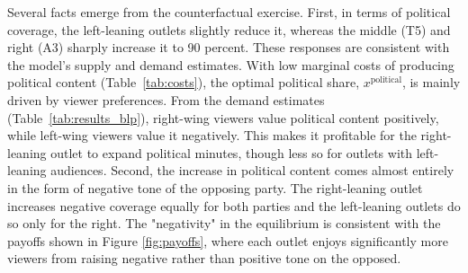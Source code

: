 \documentclass[12pt]{article}
\begin{document}
	
	
	
	
	
	Several facts emerge from the counterfactual exercise. First, in terms of political coverage, the left-leaning outlets slightly reduce it, whereas the middle (T5) and right (A3) sharply increase it to 90 percent. These responses are consistent with the model’s supply and demand estimates. With low marginal costs of producing political content (Table~\ref{tab:costs}), the optimal political share, $x^{\text{political}}$, is mainly driven by viewer preferences. From the demand estimates (Table~\ref{tab:results_blp}), right-wing viewers value political content positively, while left-wing viewers value it negatively. This makes it profitable for the right-leaning outlet to expand political minutes, though less so for outlets with left-leaning audiences. Second, the increase in political content comes almost entirely in the form of negative tone of the opposing party. The right-leaning outlet increases negative coverage equally for both parties and the left-leaning outlets do so only for the right. The "negativity" in the equilibrium is consistent with the payoffs shown in Figure \ref{fig:payoffs}, where each outlet enjoys significantly more viewers from raising negative rather than positive tone on the opposed. 
	
\end{document}
